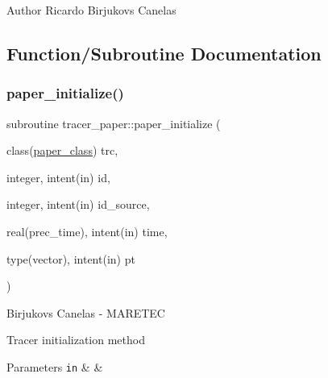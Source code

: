 \begin{DoxyAuthor}{Author}
Ricardo Birjukovs Canelas 
\end{DoxyAuthor}


\subsection{Function/\+Subroutine Documentation}
\mbox{\label{namespacetracer__paper_aad494497e50de353bb7458cc82fd617d}} 
\subsubsection{\texorpdfstring{paper\+\_\+initialize()}{paper\_initialize()}}
{\footnotesize\ttfamily subroutine tracer\+\_\+paper\+::paper\+\_\+initialize (\begin{DoxyParamCaption}\item[{class(\hyperlink{structtracer__paper_1_1paper__class}{paper\+\_\+class})}]{trc,  }\item[{integer, intent(in)}]{id,  }\item[{integer, intent(in)}]{id\+\_\+source,  }\item[{real(prec\+\_\+time), intent(in)}]{time,  }\item[{type(vector), intent(in)}]{pt }\end{DoxyParamCaption})\hspace{0.3cm}{\ttfamily [private]}}



Birjukovs Canelas -\/ M\+A\+R\+E\+T\+EC 

Tracer initialization method 
\begin{DoxyParams}[1]{Parameters}
\mbox{\tt in}  & {\em } & \\
\hline
\end{DoxyParams}
